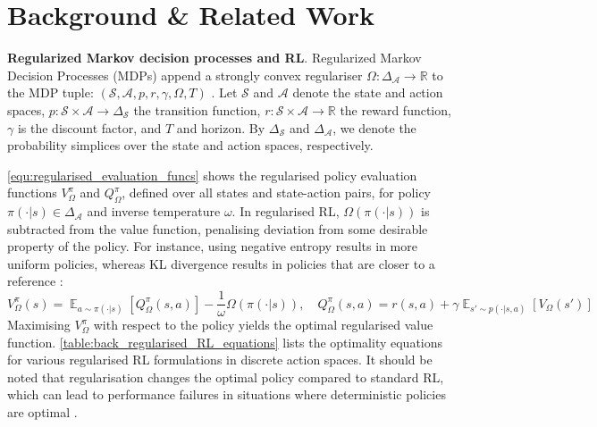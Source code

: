 \documentclass{article} %
\DeclareMathOperator*{\E}{\mathbb{E}}
\newcommand\expectwrt[2]{\E_{#2}\left[ #1 \right]}
\begin{document}
\section{Background \& Related Work}
\label{sec:background_and_related_work}


        \textbf{Regularized Markov decision processes and RL}.
            Regularized Markov Decision Processes (MDPs) append a strongly convex regulariser $\Omega: \Delta_\mathcal{A} \to \mathbb{R}$ to the MDP tuple: $(\mathcal{S}, \mathcal{A}, p, r, \gamma, \Omega, T)$ \citep{geist2019theory_regularizers}. Let $\mathcal{S}$ and $\mathcal{A}$ denote the state and action spaces, $p: \mathcal{S} \times \mathcal{A} \to \Delta_\mathcal{S}$ the transition function, $r: \mathcal{S} \times \mathcal{A} \to \mathbb{R}$ the reward function, $\gamma$ is the discount factor, and $T$ and horizon. By $\Delta_\mathcal{S}$ and $\Delta_\mathcal{A}$, we denote the probability simplices over the state and action spaces, respectively.

            \autoref{equ:regularised_evaluation_funcs} shows the regularised policy evaluation functions $V^\pi_\Omega$ and $Q^\pi_\Omega$, defined over all states and state-action pairs, for policy $\pi(\cdot | s) \in \Delta_\mathcal{A}$ and inverse temperature $\omega$. In regularised RL, $\Omega(\pi(\cdot|s))$ is subtracted from the value function, penalising deviation from some desirable property of the policy. For instance, using negative entropy results in more uniform policies, whereas KL divergence results in policies that are closer to a reference \citep{neu2017unified, haarnoja2018soft, geist2019theory_regularizers}:
            \begin{equation}
            \label{equ:regularised_evaluation_funcs}
                V^\pi_\Omega(s) = \expectwrt{Q^\pi_\Omega(s,a)}{a\sim \pi(\cdot|s)} - \frac{1}{\omega}\Omega(\pi(\cdot|s)), \quad Q^\pi_\Omega(s,a) = r(s,a) + \gamma \expectwrt{V_\Omega(s')}{s' \sim p(\cdot|s,a)}
            \end{equation}
            Maximising $V^\pi_\Omega$ with respect to the policy yields the optimal regularised value function. \autoref{table:back_regularised_RL_equations} lists the optimality equations for various regularised RL formulations in discrete action spaces. 
            It should be noted that regularisation changes the optimal policy compared to standard RL, which can lead to performance failures in situations where deterministic policies are optimal \citep{zhang2025when}.
\end{document}
